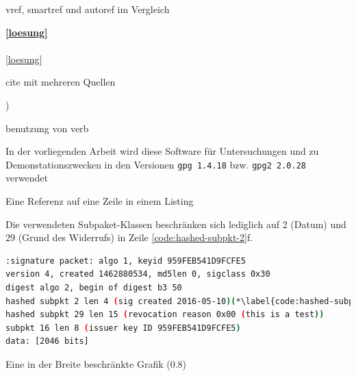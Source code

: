 \begin{formal}
	vref,  smartref und autoref im Vergleich
\end{formal}

\textbf{\vref{loesung}}\\ 
\textbf{}\\
\autoref{loesung}


\begin{formal}
	cite mit mehreren Quellen 
\end{formal}
\cite{heise-10jahrepgp, heise-gpgsupport, gpg-nytfounding, license-gpg})


\begin{formal}
	benutzung von verb
\end{formal}
In der vorliegenden Arbeit wird diese Software für Untersuchungen und zu Demonstationszwecken in den Versionen \verb|gpg 1.4.18| bzw. \verb|gpg2 2.0.28| verwendet



\begin{formal}
	Eine Referenz auf eine Zeile in einem Listing
\end{formal}
Die verwendeten Subpaket-Klassen beschränken sich lediglich auf 2 (Datum) und 29 (Grund des Widerrufs) in Zeile \ref{code:hashed-subpkt-2}f.

\begin{minipage}[t]{\textwidth}
	\begin{lstlisting}[language=bash,label={lst:pgp-packet},deletekeywords={test},caption={Ein PGP-Paket}]
:signature packet: algo 1, keyid 959FEB541D9FCFE5
version 4, created 1462880534, md5len 0, sigclass 0x30
digest algo 2, begin of digest b3 50
hashed subpkt 2 len 4 (sig created 2016-05-10)(*\label{code:hashed-subpkt-2}*)
hashed subpkt 29 len 15 (revocation reason 0x00 (this is a test))
subpkt 16 len 8 (issuer key ID 959FEB541D9FCFE5)
data: [2046 bits]
	\end{lstlisting}
\end{minipage}


\begin{formal}
	Eine in der Breite beschränkte Grafik (0.8)
\end{formal}

